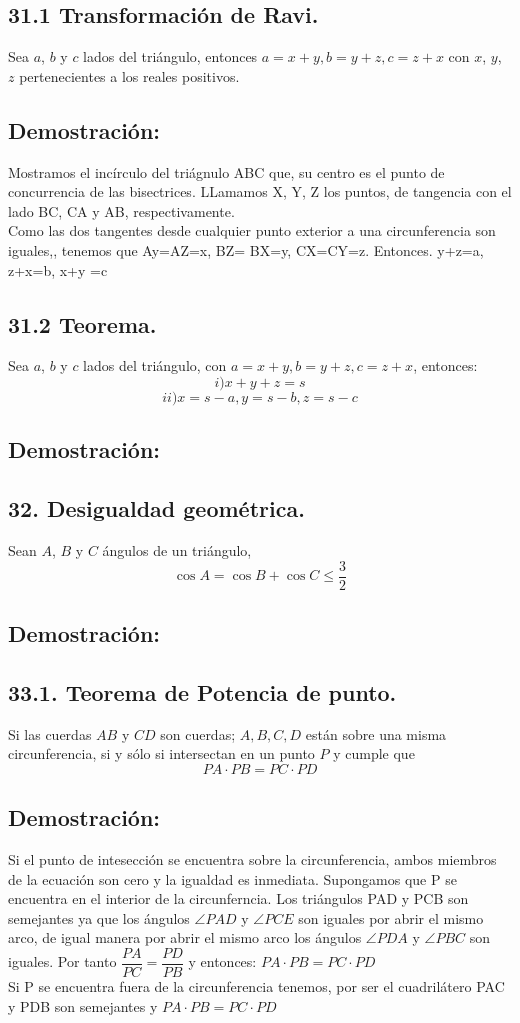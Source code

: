 \documentclass[12pt,a4paper]{article}
\begin{document}
\subsection*{31.1 Transformación de Ravi.}
Sea $a$, $b$ y $c$ lados del triángulo, entonces $a=x+y, b=y+z, c=z+x$ con $x$, $y$, $z$ pertenecientes a los reales positivos.
\subsection*{Demostración:}
Mostramos el incírculo del triágnulo ABC que, su centro es el punto de concurrencia de las bisectrices. LLamamos X, Y, Z los puntos,  de tangencia con el lado BC, CA y AB, respectivamente.
\\ Como las dos tangentes desde cualquier punto exterior a una circunferencia son iguales,, tenemos que Ay=AZ=x, BZ= BX=y, CX=CY=z. Entonces. y+z=a, z+x=b,  x+y =c
\subsection*{31.2 Teorema.}
Sea $a$, $b$ y $c$ lados del triángulo, con $a=x+y, b=y+z, c=z+x$, entonces:
$$i) x+y+z=s$$
$$ii) x=s-a , y=s-b, z=s-c$$
\subsection*{Demostración:}
\subsection*{32. Desigualdad geométrica.}
Sean $A$, $B$ y $C$ ángulos de un triángulo, $$\cos A =\cos B +\cos C \leq \dfrac{3}{2}$$ 
\subsection*{Demostración:}

\subsection*{33.1. Teorema de Potencia de punto.}
Si las cuerdas $AB$ y $CD$ son cuerdas; $A, B, C, D$ están sobre una misma circunferencia, si y sólo si intersectan en un punto $P$ y cumple que $$PA \cdot PB = PC \cdot PD$$
\subsection*{Demostración:}
Si el punto de intesección se encuentra sobre la circunferencia, ambos miembros de la ecuación son cero y la igualdad es inmediata. Supongamos que P se encuentra en el interior de la circunferncia. Los triángulos PAD y PCB son semejantes ya que los ángulos $\angle PAD$ y $\angle PCE$ son iguales por abrir el mismo arco, de igual manera por abrir el mismo arco los ángulos $\angle PDA$ y $\angle PBC$ son iguales. Por tanto $\dfrac{PA}{PC}=\dfrac{PD}{PB}$ y entonces: $PA \cdot PB = PC \cdot PD$
\\Si P se encuentra fuera de la circunferencia tenemos, por ser el cuadrilátero PAC y PDB son semejantes y $PA \cdot PB= PC \cdot PD$
\end{document}
